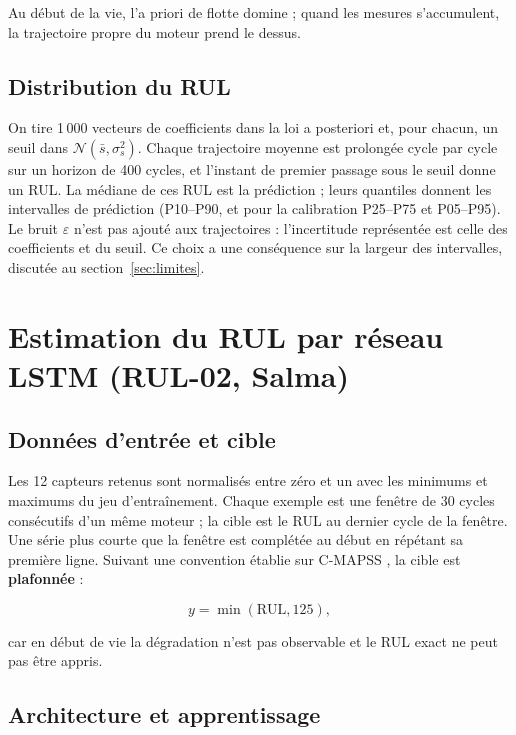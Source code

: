 Au début de la vie, l'a priori de flotte domine ; quand les mesures s'accumulent, la trajectoire propre du moteur prend le dessus.

\subsection{Distribution du RUL}

On tire 1\,000 vecteurs de coefficients dans la loi a posteriori et, pour chacun, un seuil dans $\mathcal N(\bar s, \sigma_s^2)$. Chaque trajectoire moyenne est prolongée cycle par cycle sur un horizon de 400 cycles, et l'instant de premier passage sous le seuil donne un RUL. La médiane de ces RUL est la prédiction ; leurs quantiles donnent les intervalles de prédiction (P10–P90, et pour la calibration P25–P75 et P05–P95). Le bruit $\varepsilon$ n'est pas ajouté aux trajectoires : l'incertitude représentée est celle des coefficients et du seuil. Ce choix a une conséquence sur la largeur des intervalles, discutée au section~\ref{sec:limites}.

\section{Estimation du RUL par réseau LSTM (RUL-02, Salma)}\label{sec:lstm}

\subsection{Données d'entrée et cible}

Les 12 capteurs retenus sont normalisés entre zéro et un avec les minimums et maximums du jeu d'entraînement. Chaque exemple est une fenêtre de 30 cycles consécutifs d'un même moteur ; la cible est le RUL au dernier cycle de la fenêtre. Une série plus courte que la fenêtre est complétée au début en répétant sa première ligne. Suivant une convention établie sur C-MAPSS \cite{heimes2008}, la cible est \textbf{plafonnée} :

\begin{equation}\label{eq:plafond}
y = \min(\mathrm{RUL}, 125),
\end{equation}

car en début de vie la dégradation n'est pas observable et le RUL exact ne peut pas être appris.

\subsection{Architecture et apprentissage}


